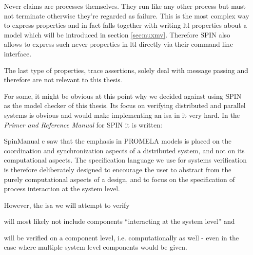 Never claims are processes themselves.
They run like any other process but must not terminate otherwise they're regarded as failure.
This is the most complex way to express properties and in fact falls together with writing \gls{ltl} properties about a model which will be introduced in section \ref{sec:nuxmv}.
Therefore SPIN also allows to express such never properties in \gls{ltl} directly via their command line interface.

The last type of properties, trace assertions, solely deal with message passing and therefore are not relevant to this thesis.

For some, it might be obvious at this point why we decided against using SPIN as the model checker of this thesis.
Its focus on verifying distributed and parallel systems is obvious and would make implementing an \gls{isa} in it very hard.
In the \textit{Primer and Reference Manual} for SPIN it is written:
\begin{displaycquote}[p.33]{SpinManual}
    e saw that the emphasis in PROMELA models is placed on the coordination and synchronization aspects of a distributed system, and not on its computational aspects. \textelp{}
    The specification language we use for systems verification is therefore deliberately designed to encourage the user to abstract from the purely computational aspects of a design, and to focus on the specification of process interaction at the system level.
\end{displaycquote}

However, the \gls{isa} we will attempt to verify
\begin{enumerate*}[label=\alph*)]
    \item will most likely not include components \enquote{interacting at the system level} and
    \item will be verified on a component level, i.e. computationally as well - even in the case where multiple system level components would be given.
\end{enumerate*}

